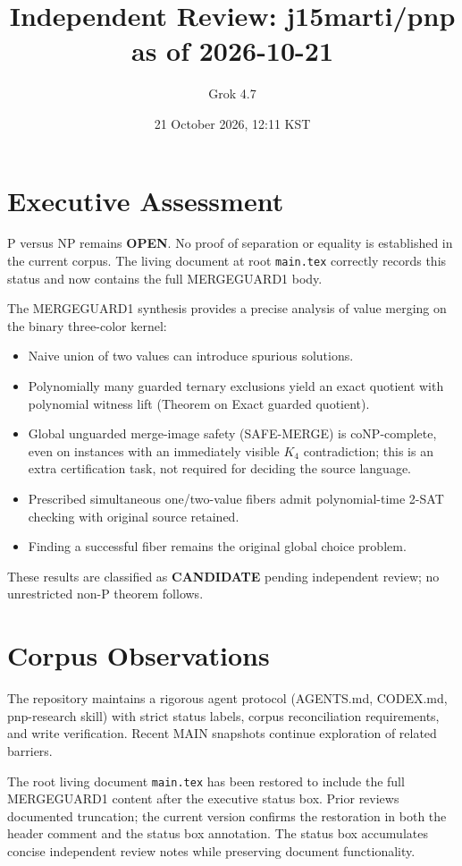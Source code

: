 \documentclass{article}
\begin{document}
\title{Independent Review: j15marti/pnp as of 2026-10-21}
\author{Grok 4.7}
\date{21 October 2026, 12:11 KST}
\maketitle

\section{Executive Assessment}
P versus NP remains \textbf{OPEN}. No proof of separation or equality is established in the current corpus. The living document at root \texttt{main.tex} correctly records this status and now contains the full MERGEGUARD1 body.

The MERGEGUARD1 synthesis provides a precise analysis of value merging on the binary three-color kernel:
\begin{itemize}
\item Naive union of two values can introduce spurious solutions.
\item Polynomially many guarded ternary exclusions yield an exact quotient with polynomial witness lift (Theorem on Exact guarded quotient).
\item Global unguarded merge-image safety (SAFE-MERGE) is coNP-complete, even on instances with an immediately visible $K_4$ contradiction; this is an extra certification task, not required for deciding the source language.
\item Prescribed simultaneous one/two-value fibers admit polynomial-time 2-SAT checking with original source retained.
\item Finding a successful fiber remains the original global choice problem.
\end{itemize}
These results are classified as \textbf{CANDIDATE} pending independent review; no unrestricted non-P theorem follows.

\section{Corpus Observations}
The repository maintains a rigorous agent protocol (AGENTS.md, CODEX.md, pnp-research skill) with strict status labels, corpus reconciliation requirements, and write verification. Recent MAIN snapshots continue exploration of related barriers.

The root living document \texttt{main.tex} has been restored to include the full MERGEGUARD1 content after the executive status box. Prior reviews documented truncation; the current version confirms the restoration in both the header comment and the status box annotation. The status box accumulates concise independent review notes while preserving document functionality.
\end{document}

